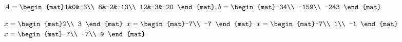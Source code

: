 \begin{Exercise}[
name={},
title={}, 
difficulty=0,
origin={\cite{GH}}]
\begin{multicols}{2}
\Question $A=\begin{mat}1&0&-3\\  8&-2&-13\\  12&-3&-20 \end{mat},\\ b=\begin{mat}-34\\  -159\\  -243 \end{mat}$
\EndCurrentQuestion
\end{multicols}

\end{Exercise}

\begin{Answer}
\Question $x=\begin{mat}2\\  3 \end{mat}$
\Question $x=\begin{mat}-7\\  -7 \end{mat}$
\Question $x=\begin{mat}-7\\  1\\  -1 \end{mat}$
\Question $x=\begin{mat}-7\\  -7\\  9 \end{mat}$
\end{Answer}
